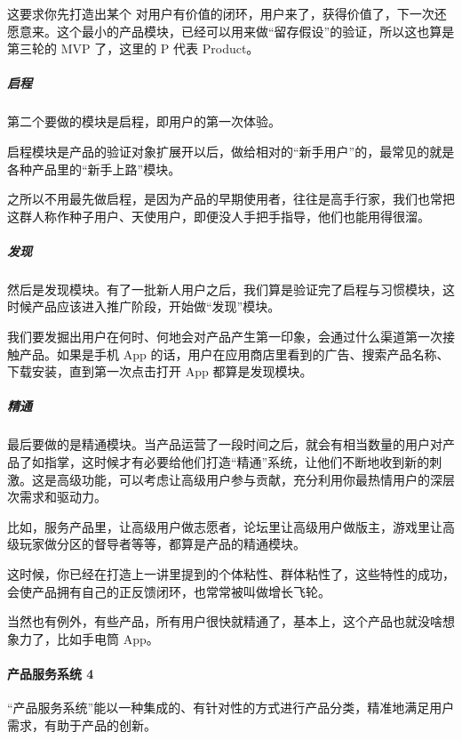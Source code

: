 \documentclass[letterpaper,10pt,english]{sphinxmanual}
\begin{document}
这要求你先打造出某个
对用户有价值的闭环，用户来了，获得价值了，下一次还愿意来。这个最小的产品模块，已经可以用来做“留存假设”的验证，所以这也算是第三轮的
MVP 了，这里的 P 代表 Product。


\subparagraph{启程}
\label{\detokenize{chapter_introduction/Product:id26}}
第二个要做的模块是启程，即用户的第一次体验。

启程模块是产品的验证对象扩展开以后，做给相对的“新手用户”的，最常见的就是各种产品里的“新手上路”模块。

之所以不用最先做启程，是因为产品的早期使用者，往往是高手行家，我们也常把这群人称作种子用户、天使用户，即便没人手把手指导，他们也能用得很溜。


\subparagraph{发现}
\label{\detokenize{chapter_introduction/Product:id27}}
然后是发现模块。有了一批新人用户之后，我们算是验证完了启程与习惯模块，这时候产品应该进入推广阶段，开始做“发现”模块。

我们要发掘出用户在何时、何地会对产品产生第一印象，会通过什么渠道第一次接触产品。如果是手机
App
的话，用户在应用商店里看到的广告、搜索产品名称、下载安装，直到第一次点击打开
App 都算是发现模块。


\subparagraph{精通}
\label{\detokenize{chapter_introduction/Product:id28}}
最后要做的是精通模块。当产品运营了一段时间之后，就会有相当数量的用户对产品了如指掌，这时候才有必要给他们打造“精通”系统，让他们不断地收到新的刺激。这是高级功能，可以考虑让高级用户参与贡献，充分利用你最热情用户的深层次需求和驱动力。

比如，服务产品里，让高级用户做志愿者，论坛里让高级用户做版主，游戏里让高级玩家做分区的督导者等等，都算是产品的精通模块。

这时候，你已经在打造上一讲里提到的个体粘性、群体粘性了，这些特性的成功，会使产品拥有自己的正反馈闭环，也常常被叫做增长飞轮。

当然也有例外，有些产品，所有用户很快就精通了，基本上，这个产品也就没啥想象力了，比如手电筒
App。


\paragraph{产品服务系统 4\sphinxfootnotemark[48]}
\label{\detokenize{chapter_introduction/Product:id29}}%
\begin{footnotetext}[48]\sphinxAtStartFootnote
{}
%
\end{footnotetext}\ignorespaces 
“产品服务系统”能以一种集成的、有针对性的方式进行产品分类，精准地满足用户需求，有助于产品的创新。
\end{document}
